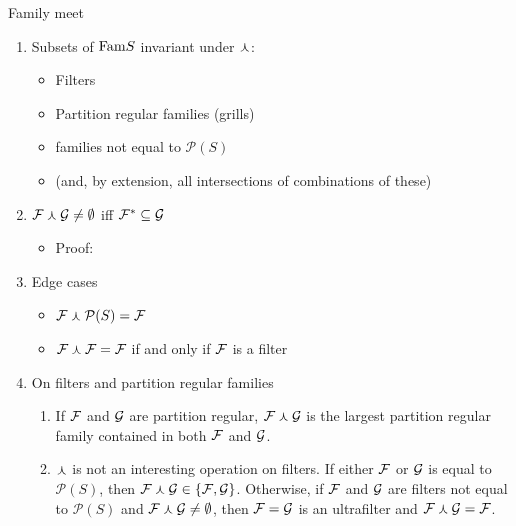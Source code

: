 Family meet
\begin{enumerate}
    \item Subsets of $\text{Fam}{S}$ invariant under $\curlywedge$:
    \begin{itemize}
        \item Filters
        \item Partition regular families (grills)
        \item families not equal to $\mathcal{P}(S)$
        \item (and, by extension, all intersections of combinations of these)
    \end{itemize}
    
    \item $\mathcal{F} \curlywedge \mathcal{G} \neq \emptyset$ iff $\mathcal{F}^* \subseteq \mathcal{G}$ 
    \begin{itemize}
        \item Proof:
    \end{itemize}
    
    \item Edge cases
    \begin{itemize}
        \item $\mathcal{F} \curlywedge \mathcal{P}(S) = \mathcal{F}$ 
        \item $\mathcal{F} \curlywedge \mathcal{F} = \mathcal{F}$ if and only if $\mathcal{F}$ is a filter
    \end{itemize}
    \item On filters and partition regular families
    \begin{enumerate}
        \item If $\mathcal{F}$ and $\mathcal{G}$ are partition regular, $\mathcal{F} \curlywedge \mathcal{G}$ is the largest partition regular family contained in both $\mathcal{F}$ and $\mathcal{G}$.
        
        \item $\curlywedge$ is not an interesting operation on filters.  If either $\mathcal{F}$ or $\mathcal{G}$ is equal to $\mathcal{P}(S)$, then $\mathcal{F} \curlywedge \mathcal{G} \in \{\mathcal{F}, \mathcal{G}\}$.  Otherwise, if $\mathcal{F}$ and $\mathcal{G}$ are filters not equal to $\mathcal{P}(S)$ and $\mathcal{F} \curlywedge \mathcal{G} \neq \emptyset$, then $\mathcal{F} = \mathcal{G}$ is an ultrafilter and $\mathcal{F} \curlywedge \mathcal{G} = \mathcal{F}$.
        

\end{enumerate}
\end{enumerate}
